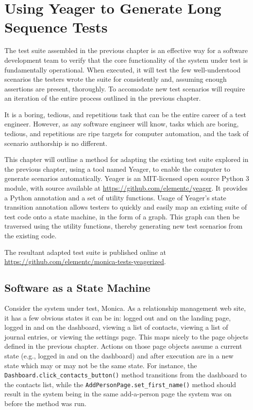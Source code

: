 \chapter{Using Yeager to Generate Long Sequence Tests}
The test suite assembled in the previous chapter is an effective way for a software development team to verify that the core functionality of the system under test is fundamentally operational. When executed, it will test the few well-understood scenarios the testers wrote the suite for consistently and, assuming enough assertions are present, thoroughly. To accomodate new test scenarios will require an iteration of the entire process outlined in the previous chapter.

It is a boring, tedious, and repetitious task that can be the entire career of a test engineer. However, as any software engineer will know, tasks which are boring, tedious, and repetitious are ripe targets for computer automation, and the task of scenario authorship is no different.

This chapter will outline a method for adapting the existing test suite explored in the previous chapter, using a tool named Yeager, to enable the computer to generate scenarios automatically. Yeager is an MIT-licensed open source Python 3 module, with source available at \newline\url{https://github.com/elementc/yeager}. It provides a Python annotation and a set of utility functions. Usage of Yeager's state transition annotation allows testers to quickly and easily map an existing suite of test code onto a state machine, in the form of a graph. This graph can then be traversed using the utility functions, thereby generating new test scenarios from the existing code.

The resultant adapted test suite is published online at \url{https://github.com/elementc/monica-tests-yeagerized}.

\section{Software as a State Machine}
Consider the system under test, Monica. As a relationship management web site, it has a few obvious states it can be in: logged out and on the landing page, logged in and on the dashboard, viewing a list of contacts, viewing a list of journal entries, or viewing the settings page. This maps nicely to the page objects defined in the previous chapter. Actions on those page objects assume a current state (e.g., logged in and on the dashboard) and after execution are in a new state which may or may not be the same state. For instance, the \texttt{Dashboard.click\_contacts\_button()} method transitions from the dashboard to the contacts list, while the \texttt{AddPersonPage.set\_first\_name()} method should result in the system being in the same add-a-person page the system was on before the method was run.

